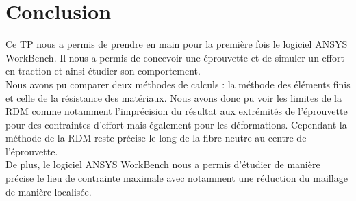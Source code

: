 \section*{Conclusion}
Ce TP nous a permis de prendre en main pour la première fois le logiciel ANSYS WorkBench. Il nous a permis de concevoir une éprouvette et de simuler un effort en traction et ainsi étudier son comportement.
\newline
\\
Nous avons pu comparer deux méthodes de calculs : la méthode des éléments finis et celle de la résistance des matériaux. Nous avons donc pu voir les limites de la RDM comme notamment l'imprécision du résultat aux extrémités de l'éprouvette pour des contraintes d'effort mais également pour les déformations. 
Cependant la méthode de la RDM reste précise le long de la fibre neutre au centre de l'éprouvette.
\newline
\\
De plus, le logiciel ANSYS WorkBench nous a permis d'étudier de manière précise le lieu de contrainte maximale avec notamment une réduction du maillage de manière localisée.